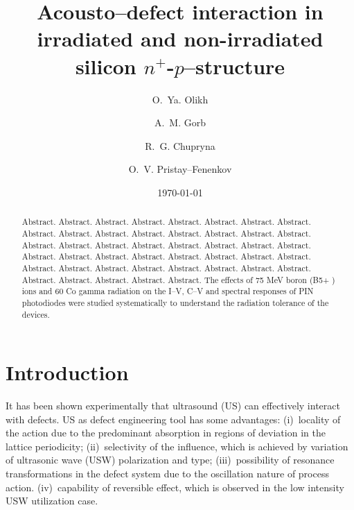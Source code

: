 \documentclass[aip,jap, amsmath,amssymb,reprint]{revtex4-1}
\begin{document}

\title{Acousto--defect interaction in irradiated and non-irradiated silicon $n^+$-$p$--structure}
\author{O.~Ya. Olikh}


\author{A.~M. Gorb}


\author{R.~G. Chupryna}

\author{O.~V. Pristay--Fenenkov}%





\date{\today}

\begin{abstract}
Abstract. Abstract. Abstract. Abstract.
Abstract.
Abstract. Abstract. Abstract. Abstract. Abstract. Abstract. Abstract.
Abstract. Abstract. Abstract. Abstract. Abstract.
Abstract. Abstract. Abstract. Abstract. Abstract.
Abstract. Abstract. Abstract.
Abstract. Abstract. Abstract. Abstract.
Abstract. Abstract. Abstract. Abstract. Abstract.
Abstract. Abstract. Abstract.
Abstract. Abstract. Abstract.
Abstract. Abstract. Abstract. Abstract.
Abstract.
The
effects of 75 MeV boron (B5+
) ions and 60
Co gamma radiation on the I–V, C–V and spectral responses of
PIN photodiodes were studied systematically to understand the radiation tolerance of the devices.
\end{abstract}


\maketitle %

\section{Introduction}
It has been shown experimentally that ultrasound (US) can effectively interact with defects.
US as defect engineering tool has some advantages:
(i)~locality of the action due to the predominant absorption in regions of deviation in the lattice periodicity;
(ii)~selectivity of the influence, which is achieved by variation of ultrasonic wave (USW) polarization and type;
(iii)~possibility of resonance transformations in the defect system due to the oscillation nature of process action.
(iv)~capability of reversible effect, which is observed in the low intensity USW utilization case.
\end{document}

